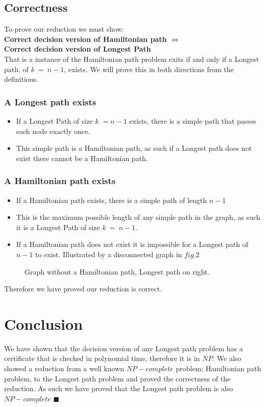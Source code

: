 \documentclass[a4paper,11pt]{article}
\begin{document}
\subsection{Correctness}
To prove our reduction we must show:\\
\textbf{Correct decision version of Hamiltonian path $\Longleftrightarrow$ 
\\Correct decision version of Longest Path}\\
That is a instance of the Hamiltonian path problem exits if and only if a 
Longest path, of $k\:=\:n-1$, exists. We will prove this in both directions 
from the definitions. 
\subsubsection{A Longest path exists}
\begin{itemize}
    \item If a Longest Path of size $k\;=n-1$ exists, there is a simple path 
    that passes each node exactly once.
    \item This simple path is a Hamiltonian path, as such if a Longest path does
     not exist there cannot be a Hamiltonian path.
\end{itemize}
\subsubsection{A Hamiltonian path exists}
\begin{itemize}
    \item If a Hamiltonian path exists, there is a simple path of length $n-1$
    \item This is the maximum possible length of any simple path in the graph,
    as such it is a Longest Path of size $k\:=\:n-1$.
    \item If a Hamiltonian path does not exist it is impossible for a Longest 
    path of $n-1$ to exist. Illustrated by a disconnected graph in $fig.2$
\end{itemize}
\begin{figure}[!h]
        \centering {}
        \caption{Graph without a Hamiltonian path, Longest path on right.}
    \end{figure}
Therefore we have proved our reduction is correct.
\section{Conclusion}
We have shown that the decision version of any Longest path problem has a 
certificate that is checked in polynomial time, therefore it is in $NP$. We also
showed a reduction from a well known $NP-complete$ problem; Hamiltonian path
problem, to the Longest path problem and proved the correctness of the reduction.
As such we have proved that the Longest path problem is also $NP-complete$ 
$\blacksquare$
\end{document}
